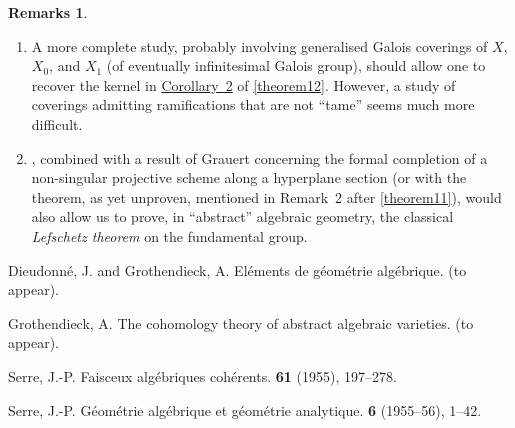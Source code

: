 \documentclass{article}
\theoremstyle{plain}
\theoremstyle{definition}
\newtheorem*{remarks}{Remarks}
\begin{document}
\begin{remarks}
  \begin{enumerate}[1)]
    \item A more complete study, probably involving generalised Galois coverings of $X$, $X_0$, and $X_1$ (of eventually infinitesimal Galois group), should allow one to recover the kernel in \hyperref[theorem12corollary2]{Corollary~2} of \cref{theorem12}.
      However, a study of coverings admitting ramifications that are not ``tame'' seems much more difficult.
    \item {}, combined with a result of Grauert concerning the formal completion of a non-singular projective scheme along a hyperplane section (or with the theorem, as yet unproven, mentioned in Remark~2 after \cref{theorem11}), would also allow us to prove, in ``abstract'' algebraic geometry, the classical \emph{Lefschetz theorem} on the fundamental group.
  \end{enumerate}
\end{remarks}



\nocite{*}
\begin{thebibliography}{4}

  {\sc Dieudonn\'{e}, J. and Grothendieck, A.}
  \newblock El\'{e}ments de g\'{e}om\'{e}trie alg\'{e}brique.
   (to appear).

  {\sc Grothendieck, A.}
  \newblock The cohomology theory of abstract algebraic varieties.
   (to appear).

  {\sc Serre, J.-P.}
  \newblock Faisceux alg\'{e}briques coh\'{e}rents.
   {\bf 61} (1955), 197--278.

  {\sc Serre, J.-P.}
  \newblock G\'{e}om\'{e}trie alg\'{e}brique et g\'{e}om\'{e}trie analytique.
   \textbf{6} (1955--56), 1--42.

\end{thebibliography}
\end{document}
